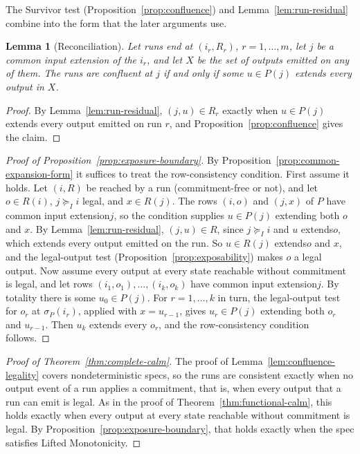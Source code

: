 \documentclass[sigconf]{cidr-2027}
\newtheorem{lemma}{Lemma}
\theoremstyle{remark}
\newcommand{\InputGe}{\succeq_I}
\newcommand{\commitment}{commitment\xspace}
\newcommand{\indesc}{input extension\xspace} %
\newcommand{\outrel}{extends\xspace}          %
\newcommand{\outrelpart}{extending\xspace}    %
\newcommand{\fiber}[1]{P(#1)}
\begin{document}
The Survivor test (Proposition~\ref{prop:confluence}) and
Lemma~\ref{lem:run-residual} combine into the form that the later arguments
use.

\begin{lemma}[Reconciliation]
\label{lem:reconciliation}
Let runs end at $(i_r,R_r)$, $r=1,\ldots,m$, let $j$ be a common \indesc of
the $i_r$, and let $X$ be the set of outputs emitted on any of them. The runs
are confluent at $j$ if and only if some $u\in\fiber{j}$ \outrel every output
in $X$.
\end{lemma}

\begin{proof}
By Lemma~\ref{lem:run-residual}, $(j,u)\in R_r$ exactly when $u\in\fiber{j}$
\outrel every output emitted on run $r$, and Proposition~\ref{prop:confluence}
gives the claim.
\end{proof}

\begin{proof}[Proof of Proposition~\ref{prop:exposure-boundary}]
By Proposition~\ref{prop:common-expansion-form} it suffices to treat the
row-consistency condition. First assume it holds. Let $(i,R)$ be reached by
a run (\commitment-free or not), and let $o\in R(i)$, $j\InputGe i$ legal, and
$x\in R(j)$. The rows $(i,o)$ and $(j,x)$ of $P$ have common \indesc $j$, so
the condition supplies $u\in P(j)$ \outrelpart both $o$ and $x$. By
Lemma~\ref{lem:run-residual}, $(j,u)\in R$, since $j\InputGe i$ and $u$
\outrel $o$, which \outrel every output emitted on the run. So $u\in R(j)$
\outrel $o$ and $x$, and the legal-output test
(Proposition~\ref{prop:exposability}) makes $o$ a legal output. Now assume
every output at every state reachable without \commitment is legal, and let
rows
$(i_1,o_1),\ldots,(i_k,o_k)$ have common \indesc $j$. By totality there is some
$u_0\in P(j)$. For $r=1,\ldots,k$ in turn, the legal-output test for $o_r$ at
$\sigma_P(i_r)$, applied with $x=u_{r-1}$, gives $u_r\in P(j)$ \outrelpart both
$o_r$ and $u_{r-1}$. Then $u_k$ \outrel every $o_r$, and the
row-consistency condition follows.
\end{proof}

\begin{proof}[Proof of Theorem~\ref{thm:complete-calm}]
The proof of Lemma~\ref{lem:confluence-legality} covers nondeterministic specs,
so the runs are consistent exactly when no output event of a run applies a
\commitment, that is, when every output that a run can emit is legal. As in
the proof of Theorem~\ref{thm:functional-calm}, this holds exactly when every output at every state reachable without \commitment is legal. By
Proposition~\ref{prop:exposure-boundary}, that holds exactly when the spec
satisfies Lifted Monotonicity.
\end{proof}
\end{document}
